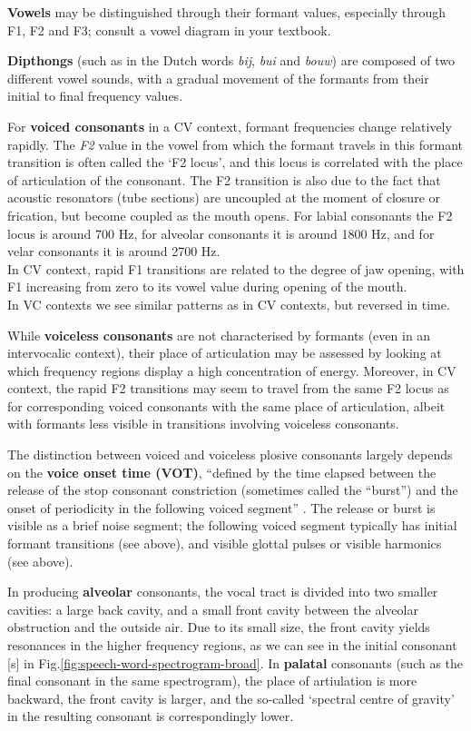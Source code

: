 \documentclass[
]{book}
\begin{document}
\textbf{Vowels} may be distinguished through their formant values, especially through F1, F2 and F3; consult a vowel diagram in your textbook.

\textbf{Dipthongs} (such as in the Dutch words \emph{bij}, \emph{bui} and \emph{bouw}) are composed of two different vowel sounds, with a gradual movement of the formants from their initial to final frequency values.

For \textbf{voiced consonants} in a CV context, formant frequencies change relatively rapidly. The \emph{F2} value in the vowel from which the formant travels in this formant transition is often called the `F2 locus', and this locus is correlated with the place of articulation of the consonant. The F2 transition is also due to the fact that acoustic resonators (tube sections) are uncoupled at the moment of closure or frication, but become coupled as the mouth opens.
For labial consonants the F2 locus is around 700 Hz, for alveolar consonants it is around 1800 Hz, and for velar consonants it is around 2700 Hz.\\
In CV context, rapid F1 transitions are related to the degree of jaw opening, with F1 increasing from zero to its vowel value during opening of the mouth.\\
In VC contexts we see similar patterns as in CV contexts, but reversed in time.

While \textbf{voiceless consonants} are not characterised by formants (even in an intervocalic context), their place of articulation may be assessed by looking at which frequency regions display a high concentration of energy. Moreover, in CV context, the rapid F2 transitions may seem to travel from the same F2 locus as for corresponding voiced consonants with the same place of articulation, albeit with formants less visible in transitions involving voiceless consonants.

The distinction between voiced and voiceless plosive consonants largely depends on the \textbf{voice onset time (VOT)}, ``defined by the time elapsed between the release of the stop consonant constriction (sometimes called the ``burst'') and the onset of periodicity in the following voiced segment'' \citep{Rubin_2022}. The release or burst is visible as a brief noise segment; the following voiced segment typically has initial formant transitions (see above), and visible glottal pulses or visible harmonics (see above).

In producing \textbf{alveolar} consonants, the vocal tract is divided into two smaller cavities: a large back cavity, and a small front cavity between the alveolar obstruction and the outside air. Due to its small size, the front cavity yields resonances in the higher frequency regions, as we can see in the initial consonant {[}s{]} in Fig.\ref{fig:speech-word-spectrogram-broad}. In \textbf{palatal} consonants (such as the final consonant in the same spectrogram), the place of artiulation is more backward, the front cavity is larger, and the so-called `spectral centre of gravity' in the resulting consonant is correspondingly lower.
\end{document}
